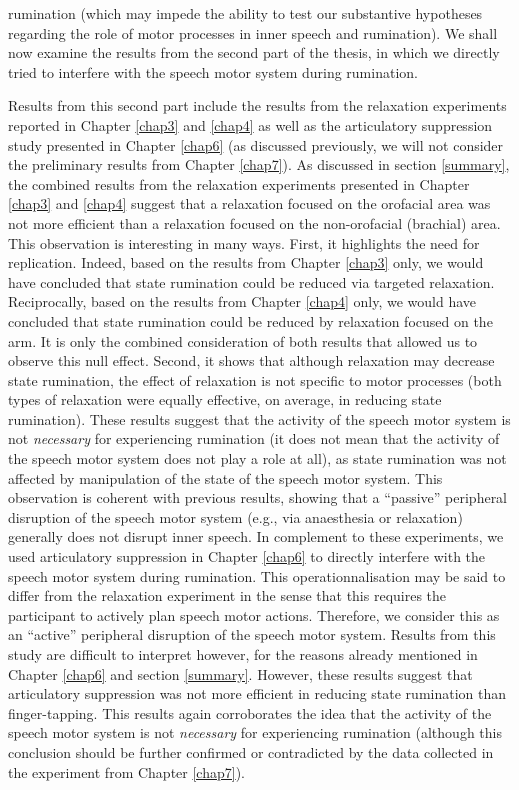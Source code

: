 \documentclass[a4paper,12pt,twoside,openright,oldfontcommands]{memoir}
\begin{document}
rumination (which may impede the ability to test our substantive hypotheses regarding the role of motor processes in inner speech and rumination). We shall now examine the results from the second part of the thesis, in which we directly tried to interfere with the speech motor system during rumination.

Results from this second part include the results from the relaxation experiments reported in Chapter \ref{chap3} and \ref{chap4} as well as the articulatory suppression study presented in Chapter \ref{chap6} (as discussed previously, we will not consider the preliminary results from Chapter \ref{chap7}). As discussed in section \ref{summary}, the combined results from the relaxation experiments presented in Chapter \ref{chap3} and \ref{chap4} suggest that a relaxation focused on the orofacial area was not more efficient than a relaxation focused on the non-orofacial (brachial) area. This observation is interesting in many ways. First, it highlights the need for replication. Indeed, based on the results from Chapter \ref{chap3} only, we would have concluded that state rumination could be reduced via targeted relaxation. Reciprocally, based on the results from Chapter \ref{chap4} only, we would have concluded that state rumination could be reduced by relaxation focused on the arm. It is only the combined consideration of both results that allowed us to observe this null effect. Second, it shows that although relaxation may decrease state rumination, the effect of relaxation is not specific to motor processes (both types of relaxation were equally effective, on average, in reducing state rumination). These results suggest that the activity of the speech motor system is not \emph{necessary} for experiencing rumination (it does not mean that the activity of the speech motor system does not play a role at all), as state rumination was not affected by manipulation of the state of the speech motor system. This observation is coherent with previous results, showing that a \enquote{passive} peripheral disruption of the speech motor system (e.g., via anaesthesia or relaxation) generally does not disrupt inner speech. In complement to these experiments, we used articulatory suppression in Chapter \ref{chap6} to directly interfere with the speech motor system during rumination. This operationnalisation may be said to differ from the relaxation experiment in the sense that this requires the participant to actively plan speech motor actions. Therefore, we consider this as an \enquote{active} peripheral disruption of the speech motor system. Results from this study are difficult to interpret however, for the reasons already mentioned in Chapter \ref{chap6} and section \ref{summary}. However, these results suggest that articulatory suppression was not more efficient in reducing state rumination than finger-tapping. This results again corroborates the idea that the activity of the speech motor system is not \emph{necessary} for experiencing rumination (although this conclusion should be further confirmed or contradicted by the data collected in the experiment from Chapter \ref{chap7}).
\end{document}
